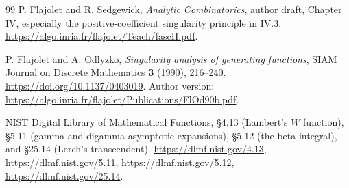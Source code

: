 \documentclass[11pt,a4paper]{article}
\theoremstyle{definition}
\theoremstyle{remark}
\numberwithin{equation}{section}
\begin{document}
\begin{thebibliography}{99}
P. Flajolet and R. Sedgewick,
\emph{Analytic Combinatorics}, author draft, Chapter IV,
especially the positive-coefficient singularity principle in IV.3.
\url{https://algo.inria.fr/flajolet/Teach/fascII.pdf}.

P. Flajolet and A. Odlyzko, \emph{Singularity analysis of generating functions},
SIAM Journal on Discrete Mathematics \textbf{3} (1990), 216--240.
\url{https://doi.org/10.1137/0403019}.
Author version:
\url{https://algo.inria.fr/flajolet/Publications/FlOd90b.pdf}.

NIST Digital Library of Mathematical Functions,
\S4.13 (Lambert's $W$ function),
\S5.11 (gamma and digamma asymptotic expansions),
\S5.12 (the beta integral), and \S25.14 (Lerch's transcendent).
\url{https://dlmf.nist.gov/4.13},
\url{https://dlmf.nist.gov/5.11},
\url{https://dlmf.nist.gov/5.12},
\url{https://dlmf.nist.gov/25.14}.
\end{thebibliography}

\end{document}
